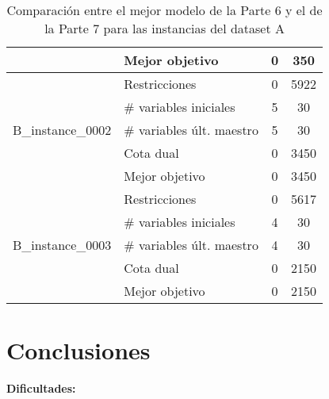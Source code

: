 \documentclass[a4paper,12pt]{article}
\begin{document}
\begin{table}[h!]
\begin{tabularx}{\textwidth}{lXcc}
  & Mejor objetivo              & 0   & 350   \\
\midrule
  \multirow{5}{*}{B\_instance\_0002} 
  & Restricciones               & 0   & 5922   \\
  & \# variables iniciales      & 5   & 30   \\
  & \# variables últ. maestro   & 5   & 30   \\
  & Cota dual                   & 0   & 3450   \\
  & Mejor objetivo              & 0   & 3450   \\
\midrule
\multirow{5}{*}{B\_instance\_0003} 
  & Restricciones               & 0   & 5617   \\
  & \# variables iniciales      & 4   & 30   \\
  & \# variables últ. maestro   & 4   & 30   \\
  & Cota dual                   & 0   & 2150   \\
  & Mejor objetivo              & 0   & 2150   \\
\bottomrule
\end{tabularx}
\caption{Comparación entre el mejor modelo de la Parte 6 y el de la Parte 7 para las instancias del dataset A}
\end{table}

\clearpage
\section{Conclusiones}

\textbf{Dificultades:}
\end{document}
